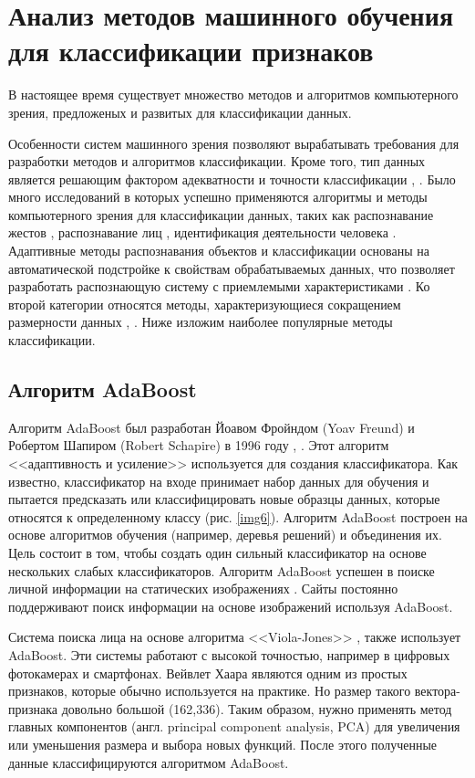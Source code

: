 \section{Анализ методов машинного обучения для классификации признаков}

В настоящее время существует множество методов и алгоритмов компьютерного зрения, предложеных и развитых для классификации данных.

Особенности систем машинного зрения позволяют вырабатывать требования для разработки методов и алгоритмов классификации. Кроме того, тип данных является решающим фактором адекватности и точности классификации \cite{segi1998}, \cite{sophi2000}. Было много исследований в которых успешно применяются алгоритмы и методы компьютерного зрения для классификации данных, таких как распознавание жестов \cite{Phan2013}, распознавание лиц \cite{Phakhi2013, Goldstein1991}, идентификация деятельности человека \cite{Kang2006, Saaidi2008}. Адаптивные методы распознавания объектов и классификации основаны на автоматической подстройке к свойствам обрабатываемых данных, что позволяет разработать распознающую систему с приемлемыми характеристиками \cite{anwef2011}. Ко второй категории относятся методы, характеризующиеся сокращением размерности данных \cite{Belhumeur1997}, \cite{Hallinan1999}. Ниже изложим наиболее популярные методы классификации.

\subsection{Алгоритм AdaBoost}

Алгоритм AdaBoost был разработан Йоавом Фройндом (Yoav Freund) и Робертом Шапиром (Robert Schapire) в 1996 году \cite{Freund1997}, \cite{Freund1996}. Этот алгоритм <<адаптивность и усиление>> используется для создания классификатора. Как известно, классификатор на входе принимает набор данных для обучения и пытается предсказать или классифицировать новые образцы данных, которые относятся к определенному классу \cite{Sochman2004} (рис. \ref{img6}). Алгоритм AdaBoost построен на основе алгоритмов обучения (например, деревья решений) и объединения их. Цель состоит в том, чтобы создать один сильный классификатор на основе нескольких слабых классификаторов. Алгоритм AdaBoost успешен в поиске личной информации на статических изображениях \cite{Su2005}. Сайты постоянно поддерживают поиск информации на основе изображений используя AdaBoost.

Система поиска лица на основе алгоритма <<Viola-Jones>> \cite{Viola2001}, \cite{Violaj2001} также использует AdaBoost. Эти системы работают с высокой точностью, например в цифровых фотокамерах и смартфонах. Вейвлет Хаара \cite{Viola2004} являются одним из простых признаков, которые обычно используется на практике. Но размер такого вектора-признака довольно большой (162,336). Таким образом, нужно применять метод главных компонентов (англ. principal component analysis, PCA) \cite{Masoud2005} для увеличения или уменьшения размера и выбора новых функций. После этого полученные данные классифицируются алгоритмом AdaBoost.


